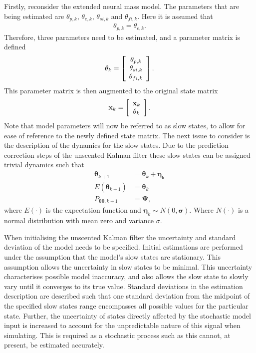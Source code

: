 Firstly, reconsider the extended neural mass model. The parameters that are being estimated are $\theta_{p,k}$, $\theta_{e,k}$, $\theta_{si,k}$ and $\theta_{fi,k}$. Here it is assumed that \begin{align}
\theta_{p,k} = \theta_{e,k}.
\end{align} Therefore, three parameters need to be estimated, and a parameter matrix is defined
\[ \mathbf{\theta}_{k} = \left[ \begin{array}[pos]{c}
\theta_{p,k}\\
\theta_{si,k} \\
\theta_{fi,k} \end{array} \right] .\] This parameter matrix is then augmented to the original state matrix
\[ \mathbf{x}_{k} = \left[ \begin{array}[pos]{c}
\mathbf{x}_{k}\\
\mathbf{\theta}_{k} \end{array} \right] .\] Note that model parameters will now be referred to as slow states, to allow for ease of reference to the newly defined state matrix. The next issue to consider is the description of the dynamics for the slow states. Due to the prediction correction steps of the unscented Kalman filter these slow states can be assigned trivial dynamics such that
\begin{align}
\label{eqn: parameterdynamics}
\mathbf{\theta}_{k+1} &= \mathbf{\theta}_{k} + \mathbf{\eta_{k}}\\
E(\mathbf{\theta}_{k+1}) &= \mathbf{\theta}_{k}\\
P_{\mathbf{\theta} \mathbf{\theta},k+1} &= \mathbf{\Psi},
\end{align} where $E(\cdot)$ is the expectation function and $\mathbf{\eta}_{k} \sim N(0,\mathbf{\sigma})$. Where $N(\cdot)$ is a normal distribution with mean zero and variance $\sigma$.

When initialising the unscented Kalman filter the uncertainty and standard deviation of the model needs to be specified. Initial estimations are performed under the assumption that the model's slow states are stationary. This assumption allows the uncertainty in slow states to be minimal. This uncertainty characterises possible model inaccuracy, and also allows the slow state to slowly vary until it converges to its true value. Standard deviations in the estimation description are described such that one standard deviation from the midpoint of the specified slow states range encompasses all possible values for the particular state. Further, the uncertainty of states directly affected by the stochastic model input is increased to account for the unpredictable nature of this signal when simulating. This is required as a stochastic process such as this cannot, at present, be estimated accurately. 

